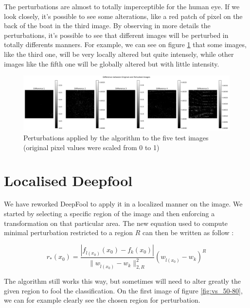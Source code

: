 \documentclass{article}
\begin{document}
The perturbations are almost to totally imperceptible for the human eye. If we look closely, it's possible to see some alterations, like a red patch of pixel on the back of the boat in the third image. By observing in more details the perturbations, it's possible to see that different images will be perturbed in totally differents manners. For example, we can see on figure \ref{fig:diff_global_grey} that some images, like the third one, will be very locally altered but quite intensely, while other images like the fifth one will be globally altered but with little intensity.

\begin{figure}[H]
    \centering
    \includegraphics[width=1\linewidth]{results/Diff_global_rescal.png}
    \caption{Perturbations applied by the algorithm to the five test images (original pixel values were scaled from 0 to 1)}
    \label{fig:diff_global_grey}
\end{figure}

\newpage
\section{Localised Deepfool}

We have reworked DeepFool to apply it in a localized manner on the image. We started by selecting a specific region of the image and then enforcing a transformation on that particular area. The new equation used to compute minimal perturbation restricted to a region $R$ can then be written as follow :

\begin{equation}
	r_*(x_0) = \frac{|f_{\hat{l}(x_0)}(x_0) - f_k(x_0)|}{\|w_{\hat{l}(x_0)} - w_k\|_{2,R}^2} (w_{\hat{l}(x_0)} - w_k)^R
\end{equation}

The algorithm still works this way, but sometimes will need to alter greatly the given region to fool the classification. On the first image of figure \ref{fig:vs_50-80}, we can for example clearly see the chosen region for perturbation.
\end{document}
